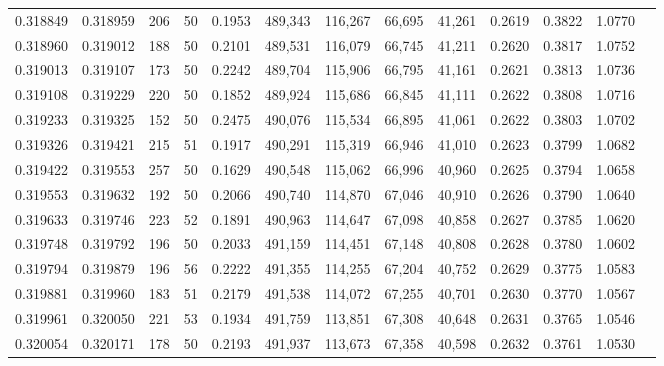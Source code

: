 \begin{tabular}{rrrrrrrrrrrrr}
0.318849 & 0.318959 &   206 &  50 &                                     0.1953 & 489,343 & 116,267 &  66,695 &  41,261 & 0.2619 & 0.3822 & 1.0770 \\
0.318960 & 0.319012 &   188 &  50 &                                     0.2101 & 489,531 & 116,079 &  66,745 &  41,211 & 0.2620 & 0.3817 & 1.0752 \\
0.319013 & 0.319107 &   173 &  50 &                                     0.2242 & 489,704 & 115,906 &  66,795 &  41,161 & 0.2621 & 0.3813 & 1.0736 \\
0.319108 & 0.319229 &   220 &  50 &                                     0.1852 & 489,924 & 115,686 &  66,845 &  41,111 & 0.2622 & 0.3808 & 1.0716 \\
0.319233 & 0.319325 &   152 &  50 &                                     0.2475 & 490,076 & 115,534 &  66,895 &  41,061 & 0.2622 & 0.3803 & 1.0702 \\
0.319326 & 0.319421 &   215 &  51 &                                     0.1917 & 490,291 & 115,319 &  66,946 &  41,010 & 0.2623 & 0.3799 & 1.0682 \\
0.319422 & 0.319553 &   257 &  50 &                                     0.1629 & 490,548 & 115,062 &  66,996 &  40,960 & 0.2625 & 0.3794 & 1.0658 \\
0.319553 & 0.319632 &   192 &  50 &                                     0.2066 & 490,740 & 114,870 &  67,046 &  40,910 & 0.2626 & 0.3790 & 1.0640 \\
0.319633 & 0.319746 &   223 &  52 &                                     0.1891 & 490,963 & 114,647 &  67,098 &  40,858 & 0.2627 & 0.3785 & 1.0620 \\
0.319748 & 0.319792 &   196 &  50 &                                     0.2033 & 491,159 & 114,451 &  67,148 &  40,808 & 0.2628 & 0.3780 & 1.0602 \\
0.319794 & 0.319879 &   196 &  56 &                                     0.2222 & 491,355 & 114,255 &  67,204 &  40,752 & 0.2629 & 0.3775 & 1.0583 \\
0.319881 & 0.319960 &   183 &  51 &                                     0.2179 & 491,538 & 114,072 &  67,255 &  40,701 & 0.2630 & 0.3770 & 1.0567 \\
0.319961 & 0.320050 &   221 &  53 &                                     0.1934 & 491,759 & 113,851 &  67,308 &  40,648 & 0.2631 & 0.3765 & 1.0546 \\
0.320054 & 0.320171 &   178 &  50 &                                     0.2193 & 491,937 & 113,673 &  67,358 &  40,598 & 0.2632 & 0.3761 & 1.0530 \\

\end{tabular}
